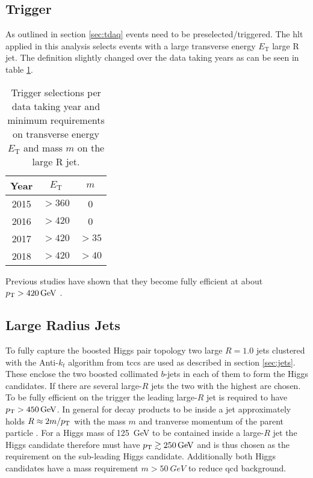 \subsection{Trigger}
As outlined in section \ref{sec:tdaq} events need to be preselected/triggered. The \ac{hlt} applied in this analysis selects events with a large transverse energy $E_\text{T}$ large R jet. The definition slightly changed over the data taking years as can be seen in table \ref{tab:trigger}.
\begin{table}[htbp]
    \centering
    \caption{Trigger selections per data taking year and minimum requirements on transverse energy $E_\text{T}$ and mass $m$ on the large R jet. }
    \begin{tabular}{ccc}
        \hline
        Year & $E_\text{T}$ & $m$   \\ \hline
        2015 & $>360$       & 0     \\
        2016 & $>420$       & 0     \\
        2017 & $>420$       & $>35$ \\
        2018 & $>420$       & $>40$ \\ \hline
    \end{tabular}
    \label{tab:trigger}
\end{table}
Previous studies have shown that they become fully efficient at about $p_{\text{T}}>\qty[]{420}{GeV}$ \citep{ATL-COM-PHYS-2020-083,ATL-COM-PHYS-2023-033}.

\subsection{Large Radius Jets}
To fully capture the boosted Higgs pair topology two large $R=1.0$ jets clustered with the Anti-$k_t$ algorithm from \acp{tcc} are used as described in section \ref{sec:jets}. These enclose the two boosted collimated $b$-jets in each of them to form the Higgs candidates. If there are several large-$R$ jets the two with the highest \pt are chosen. To be fully efficient on the trigger the leading large-$R$ jet is required to have $p_{\text{T}}>\qty[]{450}{GeV}$. In general for decay products to be inside a jet approximately holds $R\approx 2m/p_{\text{T}}$ with the mass $m$ and tranverse momentum of the parent particle \citep{ATL-COM-PHYS-2020-083}. For a Higgs mass of \qty[]{125}{GeV} to be contained inside a large-$R$ jet the Higgs candidate therefore must have $p_{\text{T}}\gtrsim \qty[]{250}{GeV}$ and is thus chosen as the \pt requirement on the sub-leading Higgs candidate. Additionally both Higgs candidates have a mass requirement $m>\qty[]{50}{GeV}$ to reduce \ac{qcd} background.

